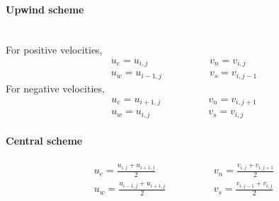 \documentclass[12pt,a4paper,fleqn]{article}
\begin{document}
\paragraph{Upwind scheme}\mbox{}\\
For positive velocities,
\begin{equation*}
\begin{aligned}
u_e = u_{i,j}\\
u_w = u_{i-1,j}
\end{aligned}
\qquad\qquad
\begin{aligned}
v_n = v_{i,j}\\
v_s = v_{i,j-1}
\end{aligned}
\end{equation*}
For negative velocities,
\begin{equation*}
\begin{aligned}
u_e = u_{i+1,j}\\
u_w = u_{i,j}
\end{aligned}
\qquad\qquad
\begin{aligned}
v_n = v_{i,j+1}\\
v_s = v_{i,j}
\end{aligned}
\end{equation*}

\paragraph{Central scheme}
\begin{equation*}
\begin{aligned}
u_e = \frac{u_{i,j} + u_{i+1,j}}{2}\\
u_w = \frac{u_{i-1,j} + u_{i+1,j}}{2}
\end{aligned}
\qquad\qquad
\begin{aligned}
v_n = \frac{v_{i,j} + v_{i,j+1}}{2}\\
v_s = \frac{v_{i,j-1} + v_{i,j}}{2}
\end{aligned}
\end{equation*}
\end{document}
